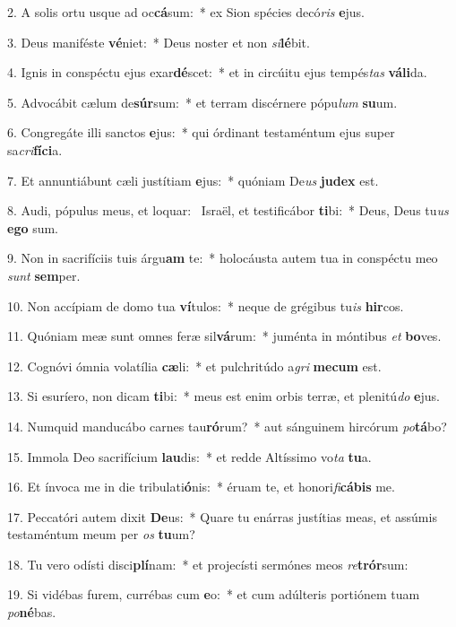 2. A solis ortu usque ad oc\textbf{cá}sum:~*  ex Sion spécies decó\textit{ris} \textbf{e}jus.\

3. Deus maniféste \textbf{vé}niet:~*  Deus noster et non \textit{si}\textbf{lé}bit.\

4. Ignis in conspéctu ejus exar\textbf{dé}scet:~*  et in circúitu ejus tempés\textit{tas} \textbf{vá}\textbf{li}da.\

5. Advocábit cælum de\textbf{súr}sum:~*  et terram discérnere pópu\textit{lum} \textbf{su}um.\

6. Congregáte illi sanctos \textbf{e}jus:~*  qui órdinant testaméntum ejus super sa\textit{cri}\textbf{fí}\textbf{ci}a.\

7. Et annuntiábunt cæli justítiam \textbf{e}jus:~*  quóniam De\textit{us} \textbf{ju}\textbf{dex} est.\

8. Audi, pópulus meus, et loquar: \dag\  Israël, et testificábor \textbf{ti}bi:~*  Deus, Deus tu\textit{us} \textbf{e}\textbf{go} sum.\

9. Non in sacrifíciis tuis árgu\textbf{am} te:~*  holocáusta autem tua in conspéctu meo \textit{sunt} \textbf{sem}per.\

10. Non accípiam de domo tua \textbf{ví}tulos:~*  neque de grégibus tu\textit{is} \textbf{hir}cos.\

11. Quóniam meæ sunt omnes feræ sil\textbf{vá}rum:~*  juménta in móntibus \textit{et} \textbf{bo}ves.\

12. Cognóvi ómnia volatília \textbf{cæ}li:~*  et pulchritúdo a\textit{gri} \textbf{me}\textbf{cum} est.\

13. Si esuríero, non dicam \textbf{ti}bi:~*  meus est enim orbis terræ, et plenitú\textit{do} \textbf{e}jus.\

14. Numquid manducábo carnes tau\textbf{ró}rum?~*  aut sánguinem hircórum \textit{po}\textbf{tá}bo?\

15. Immola Deo sacrifícium \textbf{lau}dis:~*  et redde Altíssimo vo\textit{ta} \textbf{tu}a.\

16. Et ínvoca me in die tribulati\textbf{ó}nis:~*  éruam te, et honori\textit{fi}\textbf{cá}\textbf{bis} me.\

17. Peccatóri autem dixit \textbf{De}us:~*  Quare tu enárras justítias meas, et assúmis testaméntum meum per \textit{os} \textbf{tu}um?\

18. Tu vero odísti disci\textbf{plí}nam:~*  et projecísti sermónes meos \textit{re}\textbf{trór}sum:\

19. Si vidébas furem, currébas cum \textbf{e}o:~*  et cum adúlteris portiónem tuam \textit{po}\textbf{né}bas.\

